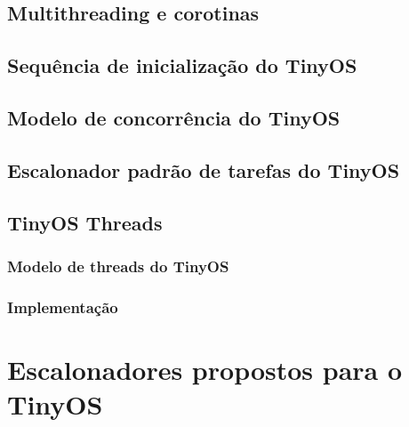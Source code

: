 \documentclass[a4paper, 10pt]{article}
\begin{document}
\subsection{Multithreading e corotinas}


\subsection {Sequência de inicialização do TinyOS}


\subsection{Modelo de concorrência do TinyOS}


\subsection{Escalonador padrão de tarefas do TinyOS}\label{escalonadorpadrao}


\subsection{TinyOS Threads} \label{TOSThreads}
\subsubsection{Modelo de threads do TinyOS}


\subsubsection{Implementação}


\section{Escalonadores propostos para o TinyOS}\label{escalonadorespropostos}

\end{document}
